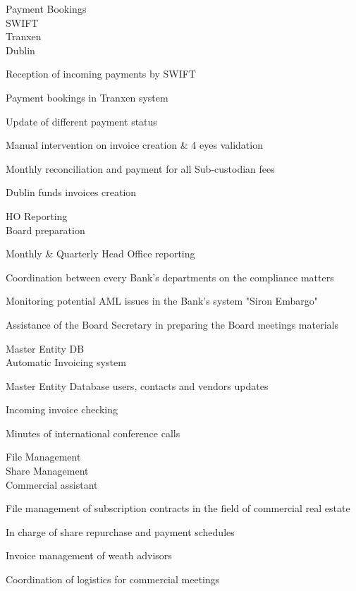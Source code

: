 \documentclass[a4paper,11pt]{cv4tw}%
\begin{document}
	{Payment Bookings\\SWIFT\\Tranxen\\Dublin}
		{
		\begin{missions}
			\item Reception of incoming payments by SWIFT
			\item Payment bookings in Tranxen system
			\item Update of different payment status
			\item Manual intervention on invoice creation \& 4 eyes validation
			\item Monthly reconciliation and payment for all Sub-custodian fees
			\item Dublin funds invoices creation
		\end{missions}
	}

	{HO Reporting\\Board preparation}
		{
		\begin{missions}
			\item Monthly \& Quarterly Head Office reporting
			\item Coordination between every Bank's departments on the compliance matters
			\item Monitoring potential AML issues in the Bank's system "Siron Embargo"
			\item Assistance of the Board Secretary in preparing the Board meetings materials
		\end{missions}
	}


	{Master Entity DB\\Automatic Invoicing system}
		{
		\begin{missions}
			\item Master Entity Database users, contacts and vendors updates
			\item Incoming invoice checking
			\item Minutes of international conference calls
		\end{missions}
	}

	{File Management\\Share Management\\Commercial assistant}
		{ 
		\begin{missions}
			\item File management of subscription contracts in the field of commercial real estate
			\item In charge of share repurchase and payment schedules
			\item Invoice management of weath advisors
			\item Coordination of logistics for commercial meetings
		\end{missions}
	}
\end{document}
